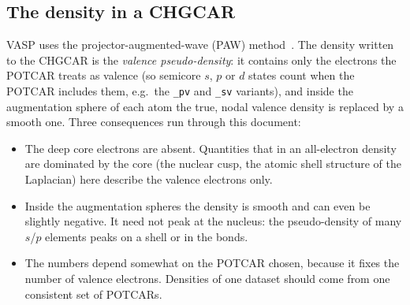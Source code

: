 \documentclass[11pt,a4paper]{article}
\begin{document}
\subsection{The density in a CHGCAR}
VASP uses the projector-augmented-wave (PAW) method~\cite{blochl}. The density written to the
CHGCAR is the \emph{valence pseudo-density}: it contains only the electrons the POTCAR treats as
valence (so semicore $s$, $p$ or $d$ states count when the POTCAR includes them, e.g.\ the
\texttt{\_pv} and \texttt{\_sv} variants), and inside the augmentation sphere of each atom the true,
nodal valence density is replaced by a smooth one. Three consequences run through this document:
\begin{itemize}[leftmargin=1.4em,itemsep=0.2ex,topsep=0.3ex]
\item The deep core electrons are absent. Quantities that in an all-electron density are dominated
  by the core (the nuclear cusp, the atomic shell structure of the Laplacian) here describe the
  valence electrons only.
\item Inside the augmentation spheres the density is smooth and can even be slightly negative.
  It need not peak at the nucleus: the pseudo-density of many $s$/$p$ elements peaks on a shell or
  in the bonds.
\item The numbers depend somewhat on the POTCAR chosen, because it fixes the number of valence
  electrons. Densities of one dataset should come from one consistent set of POTCARs.
\end{itemize}
\end{document}
